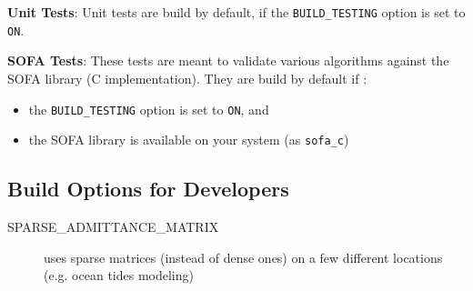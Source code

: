 \noindent\textbf{Unit Tests}: Unit tests are build by default, if the \texttt{BUILD\_TESTING} option is set 
to \texttt{ON}.

\noindent\textbf{SOFA Tests}: These tests are meant to validate various algorithms against the SOFA \cite{sofa2021}
library (C implementation). They are build by default if :
\begin{itemize}
  \item the \texttt{BUILD\_TESTING} option is set to \texttt{ON}, and
  \item the SOFA library is available on your system (as \texttt{sofa\_c})
\end{itemize}

\subsection{Build Options for Developers}
\begin{description}
  \item[SPARSE\_ADMITTANCE\_MATRIX] uses sparse matrices (instead of dense ones) on a few different locations 
  (e.g. ocean tides modeling)
\end{description}